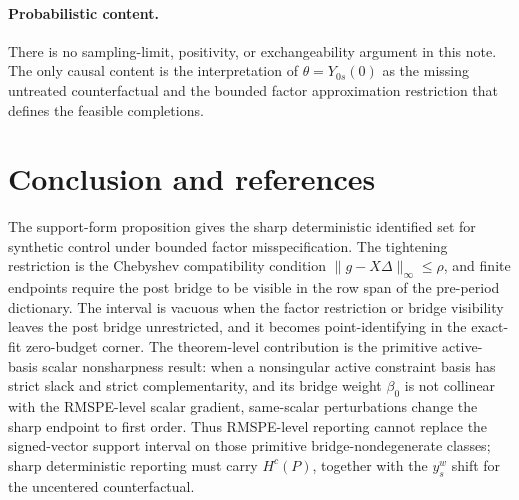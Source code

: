 \documentclass[11pt]{article}
\theoremstyle{definition}
\theoremstyle{plain}
\theoremstyle{remark}
\begin{document}
\paragraph{Probabilistic content.}
There is no sampling-limit, positivity, or exchangeability argument in this
note.  The only causal content is the interpretation of
\(\theta=Y_{0s}(0)\) as the missing untreated counterfactual and the bounded
factor approximation restriction that defines the feasible completions.

\section{Conclusion and references}
The support-form proposition gives the sharp deterministic identified set for
synthetic control under bounded factor misspecification.  The tightening
restriction is the Chebyshev compatibility condition
\(\|g-X\Delta\|_\infty\le\rho\), and finite endpoints require the post bridge to
be visible in the row span of the pre-period dictionary.  The interval is
vacuous when the factor restriction or bridge visibility leaves the post bridge
unrestricted, and it becomes point-identifying in the exact-fit zero-budget
corner.  The theorem-level contribution is the primitive active-basis scalar
nonsharpness result: when a nonsingular active constraint basis has strict slack
and strict complementarity, and its bridge weight \(\beta_0\) is not collinear
with the RMSPE-level scalar gradient, same-scalar perturbations change the
sharp endpoint to first order.  Thus RMSPE-level reporting cannot replace the
signed-vector support interval on those primitive bridge-nondegenerate classes;
sharp deterministic reporting must carry \(H^c(P)\), together with the
\(y_s^w\) shift for the uncentered counterfactual.
\end{document}
